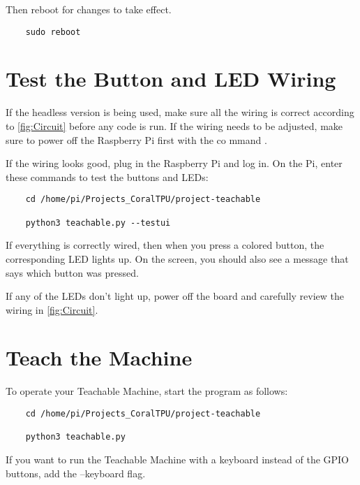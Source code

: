 Then reboot for changes to take effect.

\begin{verbatim}
	sudo reboot
\end{verbatim}



\section{Test the Button and LED Wiring}

If the headless version is being used, make sure all the wiring is correct according to \autoref{fig:Circuit} before any code is run. If the wiring needs to be adjusted, make sure to power off the Raspberry Pi first with the co
mmand .

\bigskip

If the wiring looks good, plug in the Raspberry Pi and log in. On the Pi, enter these commands to test the buttons and LEDs:

\begin{verbatim}
	cd /home/pi/Projects_CoralTPU/project-teachable
	
	python3 teachable.py --testui
\end{verbatim}


If everything is correctly wired, then when you press a colored button, the corresponding LED lights up. On the screen, you should also see a message that says which button was pressed.

If any of the LEDs don't light up, power off the board and carefully review the wiring in \autoref{fig:Circuit}.



\section{Teach the Machine}

To operate your Teachable Machine, start the program as follows:

\begin{verbatim}
	cd /home/pi/Projects_CoralTPU/project-teachable
	
	python3 teachable.py
\end{verbatim}

\begin{notes}
	\item If you want to run the Teachable Machine with a keyboard instead of the GPIO buttons, add the --keyboard flag.
\end{notes}

